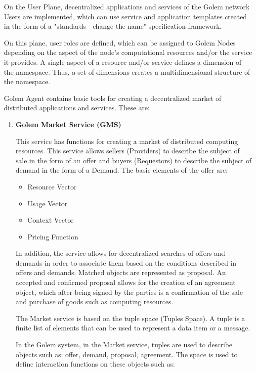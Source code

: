 On the User Plane, decentralized applications and services of the Golem network Users are implemented,
which can use service and application templates created in the form of a "standards - change the name" specification framework.

On this plane, user roles are defined, which can be assigned to Golem Nodes depending on the aspect of the node's computational resources and/or the service it provides.
A single aspect of a resource and/or service defines a dimension of the namespace.
Thus, a set of dimensions creates a multidimensional structure of the namespace.

Golem Agent contains basic tools for creating a decentralized market of distributed applications and services.
These are:

\begin{enumerate}

\item {\bf Golem Market Service (GMS)}

This service has functions for creating a market of distributed computing resources.
This service allows sellers (Providers) to describe the subject of sale in the form of an offer
and buyers (Requestors) to describe the subject of demand in the form of a Demand.
The basic elements of the offer are:


\begin{itemize}
\item	Resource Vector
\item  	Usage Vector
\item  	Context Vector
\item 	Pricing Function
\end{itemize}

In addition, the service allows for decentralized searches of offers and demands in order to associate them
based on the conditions described in offers and demands. Matched objects are represented as
proposal. An accepted and confirmed proposal allows for the creation of an agreement object, which
after being signed by the parties is a confirmation of the sale and purchase of goods such as computing resources.

The Market service is based on the tuple space (Tuples Space).
A tuple is a finite list of elements that can be used to represent a data item or a message.

In the Golem system, in the Market service, tuples are used to describe objects such as:
offer, demand, proposal, agreement. The space is used to define interaction functions on these objects
such as:


\end{enumerate}
